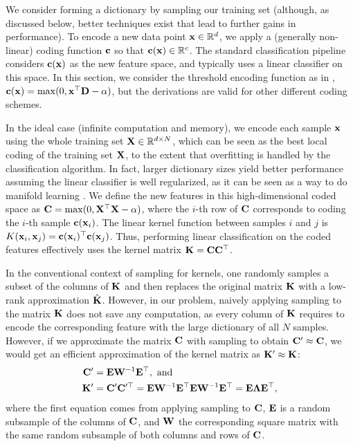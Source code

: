We consider forming a dictionary by sampling our training set (although, as discussed below, better techniques exist that lead to further gains in performance). To encode a new data point $\mathbf{x} \in \mathbb{R}^d$, we apply a (generally non-linear) coding function $\mathbf{c}$ so that $\mathbf{c}(\mathbf{x}) \in \mathbb{R}^c$. The standard classification pipeline considers $\mathbf{c}(\mathbf{x})$ as the new feature space, and typically uses a linear classifier on this space. In this section, we consider the threshold encoding function as in \cite{coates2011icml}, $\mathbf{c}(\mathbf{x}) = \max(0,\mathbf{x}^\top\mathbf{D} - \alpha)$, but the derivations are valid for other different coding schemes.

In the ideal case (infinite computation and memory), we encode each sample $\mathbf{x}$ using the whole training set $\mathbf{X} \in \mathbb{R}^{d \times N}$, which can be seen as the best local coding of the training set $\mathbf{X}$, to the extent that overfitting is handled by the classification algorithm. In fact, larger dictionary sizes yield better performance assuming the linear classifier is well regularized, as it can be seen as a way to do manifold learning \cite{wang2010locality}. We define the new features in this high-dimensional coded space as $\mathbf{C} = \max(0,\mathbf{X}^\top\mathbf{X} - \alpha)$, where the $i$-th row of $\mathbf{C}$ corresponds to coding the $i$-th sample $\mathbf{c}(\mathbf{x}_i)$. The linear kernel function between samples $i$ and $j$ is $K(\mathbf{x}_i,\mathbf{x}_j) = \mathbf{c}(\mathbf{x}_i)^\top\mathbf{c}(\mathbf{x}_j)$. Thus, performing linear classification on the coded features effectively uses the kernel matrix $\mathbf{K} = \mathbf{C}\mathbf{C}^\top$.

In the conventional context of \nystrom sampling for kernels, one randomly samples a subset of the columns of $\mathbf{K}$ and then replaces the original matrix $\mathbf{K}$ with a low-rank approximation $\hat{\mathbf{K}}$. However, in our problem, naively applying \nystrom sampling to the matrix $\mathbf{K}$ does not save any computation, as every column of $\mathbf{K}$ requires to encode the corresponding feature with the large dictionary of all $N$ samples. However, if we approximate the matrix $\mathbf{C}$ with \nystrom sampling to obtain $\mathbf{C}' \approx \mathbf{C}$, we would get an efficient approximation of the kernel matrix as $\mathbf{K}' \approx \mathbf{K}$:
\begin{align}
\mathbf{C}' & = \mathbf{E} \mathbf{W}^{-1} \mathbf{E}^\top, \text{ and}\\
\mathbf{K}' & = \mathbf{C}' \mathbf{C}'^\top = \mathbf{E} \mathbf{W}^{-1} \mathbf{E}^\top \mathbf{E} \mathbf{W}^{-1} \mathbf{E}^\top = \mathbf{E} \boldsymbol{\Lambda} \mathbf{E}^\top,
\end{align}
where the first equation comes from applying \nystrom sampling to $\mathbf{C}$, $\mathbf{E}$ is a random subsample of the columns of $\mathbf{C}$, and $\mathbf{W}$ the corresponding square matrix with the same random subsample of both columns and rows of $\mathbf{C}$.

